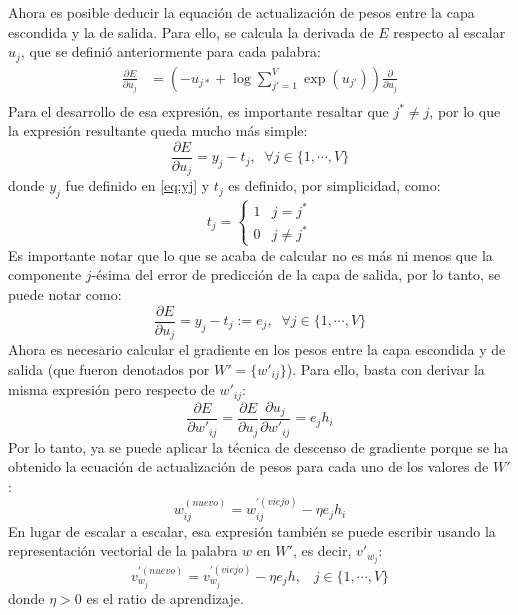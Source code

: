 Ahora es posible deducir la equación de actualización de pesos entre la capa escondida y la de salida. Para ello, se calcula
la derivada de $E$ respecto al escalar $u_j$, que se definió anteriormente para cada palabra:
\begin{equation}
  \begin{split}
  \frac{\partial E}{\partial u_j} & = \left(-u_{j*}+ \log\sum_{j'=1}^V\exp(u_{j'})\right)\frac{\partial}{\partial u_j} \\
  \end{split}
\end{equation}
Para el desarrollo de esa expresión, es importante resaltar que $j^*\neq j$, por lo que la expresión resultante queda mucho
más simple:
\begin{equation}
  \frac{\partial E}{\partial u_j} = y_j - t_j, \;\; \forall j \in \{1, \cdots, V\}
\end{equation}
donde $y_j$ fue definido en \ref*{eq:yj} y $t_j$ es definido, por simplicidad, como:
\[ t_j = \begin{cases}
  1 & j = j^* \\
  0 & j \neq j^*
\end{cases}
\]
Es importante notar que lo que se acaba de calcular no es más ni menos que la componente $j$-ésima del error de predicción de la capa de salida, por lo tanto,
se puede notar como:
\begin{equation}\label{eq:ej}
  \frac{\partial E}{\partial u_j} = y_j - t_j := e_j, \;\; \forall j \in \{1, \cdots, V\}
\end{equation}
Ahora es necesario calcular el gradiente en los pesos entre la capa escondida y de salida (que fueron denotados por $W'=\{w'_{ij}\}$). Para ello,
basta con derivar la misma expresión pero respecto de $w'_{ij}$:
\begin{equation}
  \frac{\partial E}{\partial w'_{ij}} = \frac{\partial E}{\partial u_j} \frac{\partial u_j}{\partial w'_{ij}} = e_j h_i
\end{equation}
Por lo tanto, ya se puede aplicar la técnica de descenso de gradiente porque se ha obtenido la ecuación de actualización de pesos para cada uno de los valores de $W'$:
\[
  w_{ij}^(nuevo) = w_{ij}^{'(viejo)} - \eta e_jh_i
\]
En lugar de escalar a escalar, esa expresión también se puede escribir usando la representación vectorial de la palabra $w$ en $W'$, es decir, $v'_{w_j}$:
\[
  v_{w_j}^{'(nuevo) }= v_{w_j}^{'(viejo)} - \eta e_j h, \;\;\; j \in \{1, \cdots, V\}
\]
donde $\eta > 0$ es el ratio de aprendizaje.

